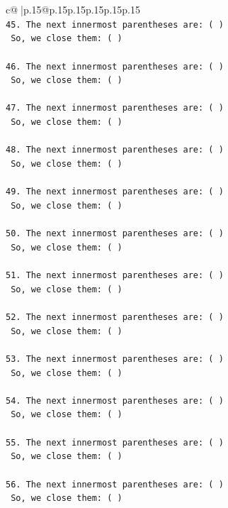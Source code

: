 \documentclass{article}
\begin{document}
{\begin{supertabular}{c@{$\;$}|p{.15\linewidth}@{}p{.15\linewidth}p{.15\linewidth}p{.15\linewidth}p{.15\linewidth}p{.15\linewidth}}
{{{\\ 
\texttt{45. The next innermost parentheses are: ( ) } \\
\texttt{    So, we close them: ( ) } \\
\\ 
\texttt{46. The next innermost parentheses are: ( ) } \\
\texttt{    So, we close them: ( ) } \\
\\ 
\texttt{47. The next innermost parentheses are: ( ) } \\
\texttt{    So, we close them: ( ) } \\
\\ 
\texttt{48. The next innermost parentheses are: ( ) } \\
\texttt{    So, we close them: ( ) } \\
\\ 
\texttt{49. The next innermost parentheses are: ( ) } \\
\texttt{    So, we close them: ( ) } \\
\\ 
\texttt{50. The next innermost parentheses are: ( ) } \\
\texttt{    So, we close them: ( ) } \\
\\ 
\texttt{51. The next innermost parentheses are: ( ) } \\
\texttt{    So, we close them: ( ) } \\
\\ 
\texttt{52. The next innermost parentheses are: ( ) } \\
\texttt{    So, we close them: ( ) } \\
\\ 
\texttt{53. The next innermost parentheses are: ( ) } \\
\texttt{    So, we close them: ( ) } \\
\\ 
\texttt{54. The next innermost parentheses are: ( ) } \\
\texttt{    So, we close them: ( ) } \\
\\ 
\texttt{55. The next innermost parentheses are: ( ) } \\
\texttt{    So, we close them: ( ) } \\
\\ 
\texttt{56. The next innermost parentheses are: ( ) } \\
\texttt{    So, we close them: ( ) } \\
}}}
\end{supertabular}}
\end{document}
